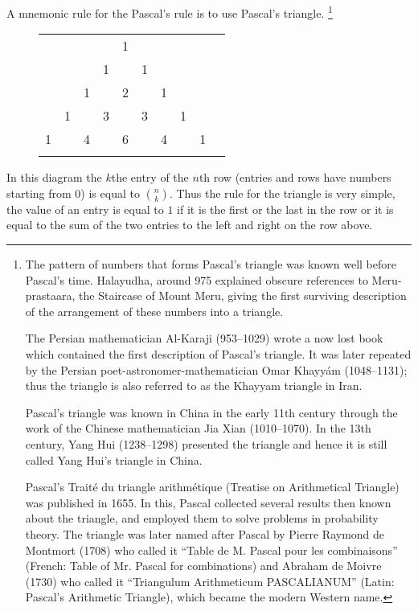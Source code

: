 A mnemonic rule for the Pascal's rule is to use Pascal's triangle.
\footnote{
  The pattern of numbers that forms Pascal's triangle was known well before
  Pascal's time.  Halayudha, around 975 explained obscure references to
  Meru-prastaara, the Staircase of Mount Meru, giving the first surviving
  description of the arrangement of these numbers into a triangle.

  The Persian mathematician Al-Karaji (953–1029) wrote a now lost book which
  contained the first description of Pascal's triangle. It was later repeated by
  the Persian poet-astronomer-mathematician Omar Khayyám (1048–1131); thus the
  triangle is also referred to as the Khayyam triangle in Iran.

  Pascal's triangle was known in China in the early 11th century through the
  work of the Chinese mathematician Jia Xian (1010–1070). In the 13th century,
  Yang Hui (1238–1298) presented the triangle and hence it is still called Yang
  Hui's triangle in China.

  Pascal's Traité du triangle arithmétique (Treatise on Arithmetical Triangle)
  was published in 1655. In this, Pascal collected several results then known
  about the triangle, and employed them to solve problems in probability theory.
  The triangle was later named after Pascal by Pierre Raymond de Montmort (1708)
  who called it ``Table de M. Pascal pour les combinaisons'' (French: Table of
  Mr. Pascal for combinations) and Abraham de Moivre (1730) who called it
  ``Triangulum Arithmeticum PASCALIANUM'' (Latin: Pascal's Arithmetic Triangle),
  which became the modern Western name.
}
\begin{figure}
  \centering
  \begin{tabular}{lccccccccc}
    &    &    &    &  1\\\noalign{\smallskip\smallskip}
    &    &    &  1 &    &  1\\\noalign{\smallskip\smallskip}
    &    &  1 &    &  2 &    &  1\\\noalign{\smallskip\smallskip}
    &  1 &    &  3 &    &  3 &    &  1\\\noalign{\smallskip\smallskip}
    1 &    &  4 &    &  6 &    &  4 &    &  1\\\noalign{\smallskip\smallskip}
  \end{tabular}
\end{figure}
In this diagram the $k$the entry of the $n$th row
(entries and rows have numbers starting from $0$) is equal to $\binom{n}{k}$.
Thus the rule for the triangle is very simple, the value of an entry is equal
to $1$ if it is the first or the last in the row or it is equal to the sum
of the two entries to the left and right on the row above.


